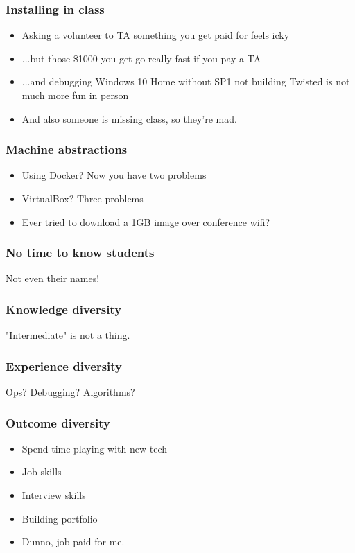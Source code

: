\begin{frame}[fragile]
\frametitle{Installing in class}

\begin{itemize}
\item Asking a volunteer to TA something you get paid for feels icky
      \pause
\item ...but those \$1000 you get go really fast if you pay a TA
      \pause
\item ...and debugging Windows 10 Home without SP1 not building Twisted
      is not much more fun in person
      \pause
\item And also someone is missing class, so they're mad.
\end{itemize}

\end{frame}

\begin{frame}
\frametitle{Machine abstractions}

\begin{itemize}
\item Using Docker? Now you have two problems
\item VirtualBox? Three problems
\item Ever tried to download a 1GB image over conference wifi?
\end{itemize}

\end{frame}

\begin{frame}
\frametitle{No time to know students}

Not even their names!
\end{frame}

\begin{frame}
\frametitle{Knowledge diversity}

"Intermediate" is not a thing.

\end{frame}

\begin{frame}
\frametitle{Experience diversity}

Ops? Debugging? Algorithms?

\end{frame}


\begin{frame}
\frametitle{Outcome diversity}

\begin{itemize}
\item Spend time playing with new tech
\item Job skills
\item Interview skills
\item Building portfolio
\item Dunno, job paid for me.
\end{itemize}

\end{frame}

